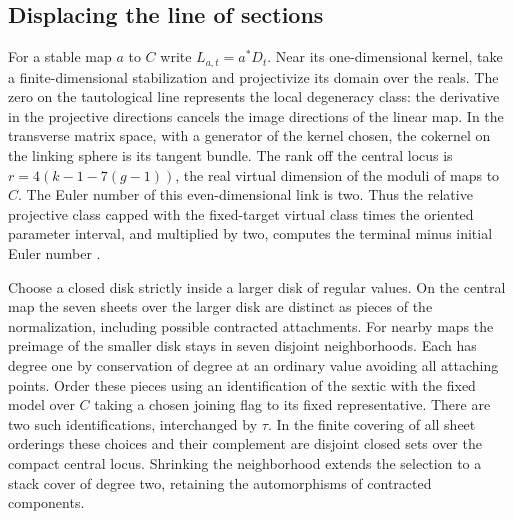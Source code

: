 \subsection{Displacing the line of sections}
For a stable map $a$ to $C$ write $L_{a,t}=a^*D_t$. Near its
one-dimensional kernel, take a finite-dimensional stabilization and
projectivize its domain over the reals. The zero on the tautological
line represents the local degeneracy class: the derivative in the
projective directions cancels the image directions of the linear map.
In the transverse matrix space, with a generator of the kernel chosen,
the cokernel on the linking sphere is its tangent bundle. The rank off
the central locus is $r=4(k-1-7(g-1))$, the real virtual dimension of
the moduli of maps to $C$. The Euler number of this even-dimensional
link is two. Thus the relative projective class capped with the
fixed-target virtual class times the oriented parameter interval,
and multiplied by two, computes the terminal minus initial Euler
number \cite[\S6.2, Lemma~6.10 and Appendix~B]{bai}.

Choose a closed disk strictly inside a larger disk of regular values.
On the central map the seven sheets over the larger disk are distinct
as pieces of the normalization, including possible contracted
attachments. For nearby maps the preimage of the smaller disk stays
in seven disjoint neighborhoods. Each has degree one by conservation
of degree at an ordinary value avoiding all attaching points. Order
these pieces using an identification of the sextic with the fixed
model over $C$ taking a chosen joining flag to its fixed representative.
There are two such identifications, interchanged by $\tau$. In the
finite covering of all sheet orderings these choices and their
complement are disjoint closed sets over the compact central locus.
Shrinking the neighborhood extends the selection to a stack cover of
degree two, retaining the automorphisms of contracted components.


